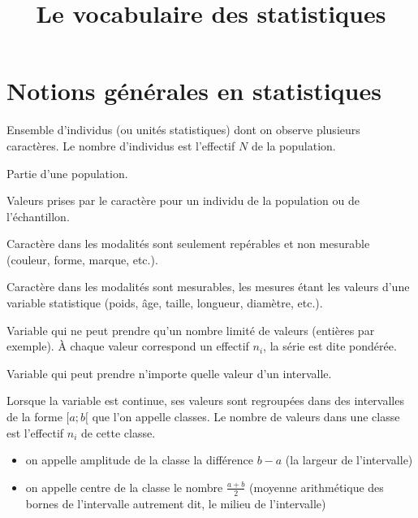 \documentclass[a4paper,12pt]{scrartcl}
\title{Le vocabulaire des statistiques}
\date{}
\begin{document}
\maketitle

\section*{Notions générales en statistiques}



Ensemble d'individus (ou unités statistiques) dont on observe plusieurs caractères. Le nombre d'individus est l'effectif $N$ de la population.


Partie d'une population.


Valeurs prises par le caractère pour un individu de la population ou de l'échantillon.


Caractère dans les modalités sont seulement repérables et non mesurable (couleur, forme, marque, etc.).


Caractère dans les modalités sont mesurables, les mesures étant les valeurs d'une variable statistique (poids, âge, taille, longueur, diamètre, etc.).


Variable qui ne peut prendre qu'un nombre limité de valeurs (entières par exemple). À chaque valeur correspond un effectif $n_i$, la série est dite pondérée.


Variable qui peut prendre n'importe quelle valeur d'un intervalle.


Lorsque la variable est continue, ses valeurs sont regroupées dans des intervalles de la forme $[a;b[$ que l'on appelle classes. Le nombre de valeurs dans une classe est l'effectif $n_i$ de cette classe.

\begin{itemize}
\item on appelle amplitude de la classe la différence $b-a$ (la largeur de l'intervalle)
\item on appelle centre de la classe le nombre $\frac{a+b}{2}$ (moyenne arithmétique des bornes de l'intervalle autrement dit, le milieu de l'intervalle)
\end{itemize}
\end{document}
